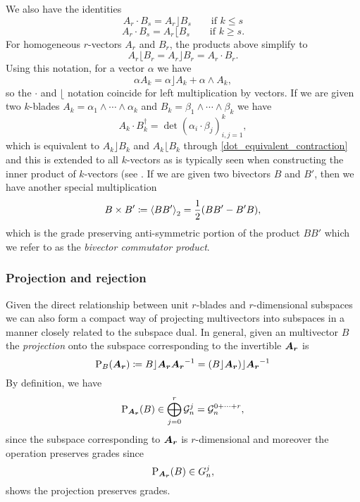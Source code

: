We also have the identities
\begin{equation}
\label{eq:left_contraction_dot}
A_r \cdot B_s = A_r \rfloor B_s \qquad \textrm{if $k\leq s$}
\end{equation}
\begin{equation}
\label{eq:right_contraction_dot}
A_r \cdot B_s = A_r \lfloor B_s \qquad \textrm{if $k\geq s$}.
\end{equation}
For homogeneous $r$-vectors $A_r$ and $B_r$, the products above simplify to 
\begin{equation}
\label{dot_equivalent_contraction}
    A_r \lfloor B_r = A_r \rfloor B_r = A_r \cdot B_r.
\end{equation}
Using this notation, for a vector $\alpha$ we have
\begin{equation}
\alpha A_k = \alpha \rfloor A_k + \alpha \wedge A_k,
\end{equation}
so the $\cdot$ and $\lfloor$ notation coincide for left multiplication by vectors. If we are given two $k$-blades $A_k = \alpha_1 \wedge \cdots \wedge \alpha_k$ and $B_k = \beta_1 \wedge \cdots \wedge \beta_k$ we have 
\begin{equation}
\label{eq:dot_product}
A_k \cdot B_k^\dagger = \det(\alpha_i \cdot \beta_j )_{i,j=1}^k,
\end{equation}
which is equivalent to $A_k \rfloor B_k$ and $A_k \lfloor B_k$ through \ref{dot_equivalent_contraction} and this is extended to all $k$-vectors as is typically seen when constructing the inner product of $k$-vectors (see \cite{hestenes_clifford_1986}. If we are given two bivectors $B$ and $B'$, then we have another special multiplication
\begin{equation}
\label{eq:bivector_product}
B\times B' \coloneqq \proj{2}{BB'} = \frac{1}{2} (BB' - B'B),
\end{equation}
which is the grade preserving anti-symmetric portion of the product $BB'$ which we refer to as the \emph{bivector commutator product}.


\subsubsection{Projection and rejection}

Given the direct relationship between unit $r$-blades and $r$-dimensional subspaces we can also form a compact way of projecting multivectors into subspaces in a manner closely related to the subspace dual.  In general, given an multivector $B$ the \emph{projection} onto the subspace corresponding to the invertible $\boldsymbol{A_r}$ is
\begin{equation}
\label{eq:projection}
\projection_{B}(\blade{A_r}) \coloneqq B\rfloor \blade{A_r} \blade{A_r}^{-1} = (B\rfloor \blade{A_r})\rfloor \blade{A_r}^{-1}
\end{equation}
By definition, we have
\[
\operatorname{P}_{\boldsymbol{A_r}}(B) \in \bigoplus_{j=0}^r \mathcal{G}_n^j = \mathcal{G}_n^{0+\cdots + r},
\]
since the subspace corresponding to $\boldsymbol{A_r}$ is $r$-dimensional and moreover the operation preserves grades since
\[
\operatorname{P}_{\boldsymbol{A_r}}(B) \in G_n^j,
\]
shows the projection preserves grades.


